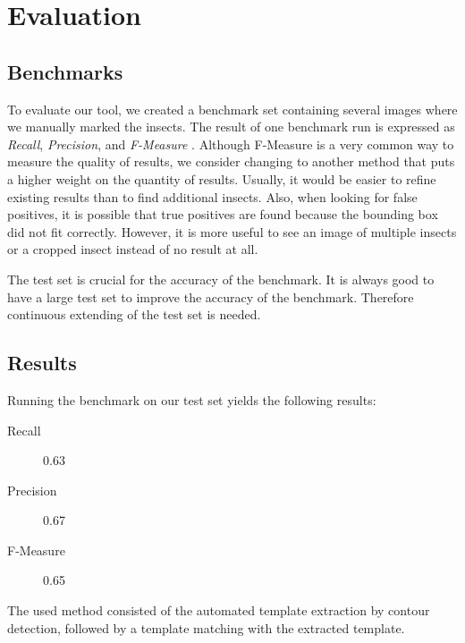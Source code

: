 %
\section{Evaluation}
\label{sec_eval}

\subsection{Benchmarks}
To evaluate our tool, we created a benchmark set containing several images where we manually marked the insects.
The result of one benchmark run is expressed as \textit{Recall}, \textit{Precision}, and \textit{F-Measure} \cite{f_measure}.
Although F-Measure is a very common way to measure the quality of results, we consider changing  to another method that puts a higher weight on the quantity of results. 
Usually, it would be easier to refine existing results than to find additional insects. 
Also, when looking for false positives, it is possible that true positives are found because the bounding box did not fit correctly.
However, it is more useful to see an image of multiple insects or a cropped insect instead of no result at all.

The test set is crucial for the accuracy of the benchmark. 
It is always good to have a large test set to improve the accuracy of the benchmark.
Therefore continuous extending of the test set is needed. 

\subsection{Results}

Running the benchmark on our test set yields the following results:
%
\begin{description}
	\item[Recall] 0.63
	\item[Precision] 0.67
	\item[F-Measure] 0.65
\end{description}
%
The used method consisted of the automated template extraction by contour detection, followed by a template matching with the extracted template.
